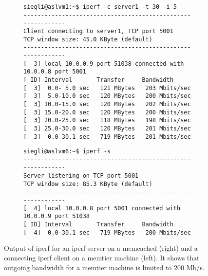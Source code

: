 \documentclass[11pt,a4paper]{article}
\makeatletter
\newcommand{\verbatimfont}[1]{\renewcommand{\verbatim@font}{\ttfamily#1}}
\makeatother
\begin{document}
\verbatimfont{\tiny}%
\begin{figure}
\centering
\begin{subfigure}[t]{.5\textwidth}
  
    \begin{verbatim}
siegli@aslvm1:~$ iperf -c server1 -t 30 -i 5
------------------------------------------------------------
Client connecting to server1, TCP port 5001
TCP window size: 45.0 KByte (default)
------------------------------------------------------------
[  3] local 10.0.0.9 port 51038 connected with 10.0.0.8 port 5001
[ ID] Interval       Transfer     Bandwidth
[  3]  0.0- 5.0 sec   121 MBytes   203 Mbits/sec
[  3]  5.0-10.0 sec   120 MBytes   200 Mbits/sec
[  3] 10.0-15.0 sec   120 MBytes   202 Mbits/sec
[  3] 15.0-20.0 sec   120 MBytes   200 Mbits/sec
[  3] 20.0-25.0 sec   118 MBytes   198 Mbits/sec
[  3] 25.0-30.0 sec   120 MBytes   201 Mbits/sec
[  3]  0.0-30.1 sec   719 MBytes   201 Mbits/sec

    \end{verbatim}
\end{subfigure}%
\begin{subfigure}[t]{.5\textwidth}
 
    \begin{verbatim}
siegli@aslvm6:~$ iperf -s
------------------------------------------------------------
Server listening on TCP port 5001
TCP window size: 85.3 KByte (default)
------------------------------------------------------------
[  4] local 10.0.0.8 port 5001 connected with 10.0.0.9 port 51038
[ ID] Interval       Transfer     Bandwidth
[  4]  0.0-30.1 sec   719 MBytes   200 Mbits/sec   

    \end{verbatim}
\end{subfigure}
\caption{Output of iperf for an iperf server on a memcached (right) and a connecting iperf client on a memtier machine (left). It shows that outgoing bandwidth for a memtier machine is limited to 200 Mb/s.}
\label{fig:bl:iperf_cl_server}
\end{figure}
\end{document}
